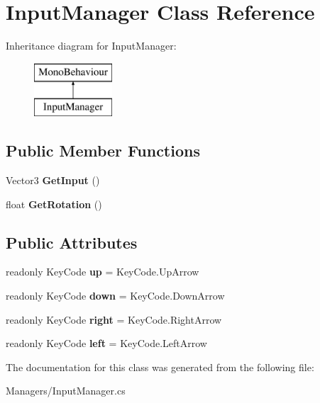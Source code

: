 \hypertarget{class_input_manager}{}\section{Input\+Manager Class Reference}
\label{class_input_manager}
Inheritance diagram for Input\+Manager\+:\begin{figure}[H]
\begin{center}
\leavevmode
\includegraphics[height=2.000000cm]{class_input_manager}
\end{center}
\end{figure}
\subsection*{Public Member Functions}
\begin{DoxyCompactItemize}
\item 
\mbox{\label{class_input_manager_acf01328e091cb2022690daa1867475cd}} 
Vector3 {\bfseries Get\+Input} ()
\item 
\mbox{\label{class_input_manager_a2df3a6a7e7789a61ae6a3531f793cfb4}} 
float {\bfseries Get\+Rotation} ()
\end{DoxyCompactItemize}
\subsection*{Public Attributes}
\begin{DoxyCompactItemize}
\item 
\mbox{\label{class_input_manager_ad82b77ce91bb68a045f14f253e56fcc8}} 
readonly Key\+Code {\bfseries up} = Key\+Code.\+Up\+Arrow
\item 
\mbox{\label{class_input_manager_a378d42cd117f980f5b0f0bd466a09ac0}} 
readonly Key\+Code {\bfseries down} = Key\+Code.\+Down\+Arrow
\item 
\mbox{\label{class_input_manager_a6fa31975cf4eb636282a93337f7ad87d}} 
readonly Key\+Code {\bfseries right} = Key\+Code.\+Right\+Arrow
\item 
\mbox{\label{class_input_manager_a3d109505d11062cb4884e2bed14a1fc2}} 
readonly Key\+Code {\bfseries left} = Key\+Code.\+Left\+Arrow
\end{DoxyCompactItemize}


The documentation for this class was generated from the following file\+:\begin{DoxyCompactItemize}
\item 
Managers/Input\+Manager.\+cs\end{DoxyCompactItemize}
